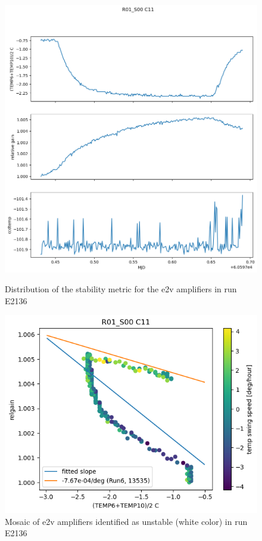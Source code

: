 \begin{figure}[htbp]
\centering
\begin{minipage}{0.45\textwidth}
    \centering
    \includegraphics[width=\textwidth]{sections/figures/RelgainParametersTrending.png}
    \caption{Distribution of the stability metric for the e2v amplifiers in run E2136}
\end{minipage}
\hfill
\begin{minipage}{0.45\textwidth}
    \centering
    \includegraphics[width=\textwidth]{sections/figures/RelgainDetail.png}
    \caption{Mosaic of e2v amplifiers identified as unstable (white color) in run E2136}
\end{minipage}
\end{figure}


